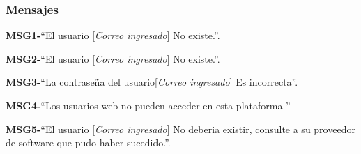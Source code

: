 \subsubsection{Mensajes}
	\begin{Citemize}
		\item {\bf MSG1-}``El usuario [{\em Correo ingresado}] No existe.''.
		\item {\bf MSG2-}``El usuario [{\em Correo ingresado}] No existe.''.
		\item {\bf MSG3-}``La contraseña del usuario[{\em Correo ingresado}] Es incorrecta''.
		\item {\bf MSG4-}``Los usuarios web no pueden acceder en esta plataforma '' 
		\item {\bf MSG5-}``El usuario [{\em Correo ingresado}] No deberia existir, consulte a su proveedor de software que pudo haber sucedido.''.
	\end{Citemize}